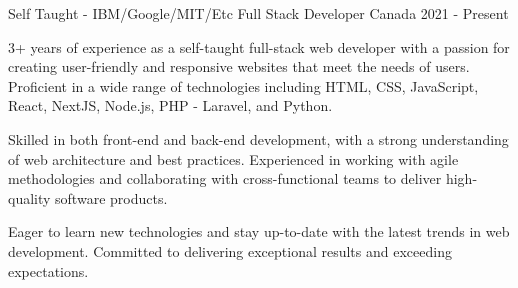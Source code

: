 

\begin{cventries}

  \cventry
    {Self Taught - IBM/Google/MIT/Etc} %
    {Full Stack Developer} %
    {Canada} %
    {2021 - Present} %
    {
      \begin{cvitems} %
        \item {3+ years of experience as a self-taught full-stack web developer with a passion for creating user-friendly and responsive websites that meet the needs of users. Proficient in a wide range of technologies including HTML, CSS, JavaScript, React, NextJS, Node.js, PHP - Laravel, and Python.}
        \item {Skilled in both front-end and back-end development, with a strong understanding of web architecture and best practices. Experienced in working with agile methodologies and collaborating with cross-functional teams to deliver high-quality software products.}
        \item {Eager to learn new technologies and stay up-to-date with the latest trends in web development. Committed to delivering exceptional results and exceeding expectations.}
      \end{cvitems}
    }


\end{cventries}
